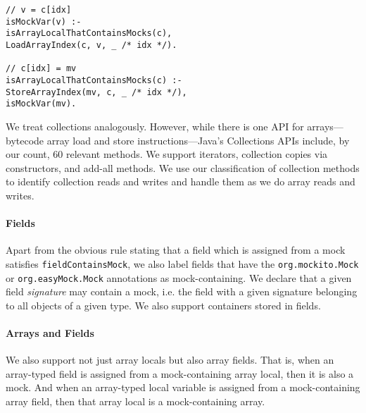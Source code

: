 \begin{lstlisting}[basicstyle=\ttfamily\small,numbers=none]
// v = c[idx]
isMockVar(v) :-
isArrayLocalThatContainsMocks(c),
LoadArrayIndex(c, v, _ /* idx */).

// c[idx] = mv
isArrayLocalThatContainsMocks(c) :-
StoreArrayIndex(mv, c, _ /* idx */),
isMockVar(mv).
\end{lstlisting}

We treat collections analogously. However, while there is one API for arrays---bytecode array load and store instructions---Java's Collections APIs include, by our count, 60 relevant methods. We support iterators, collection copies via constructors, and add-all methods. We use our classification of collection methods to identify collection reads and writes and handle them as we do array reads and writes.%

\paragraph{Fields} Apart from the obvious rule stating that a field which is assigned from a mock satisfies {\tt fieldContainsMock}, we also label fields that have the {\tt org.mockito.Mock} or {\tt org.easyMock.Mock} annotations as mock-containing. We declare that a given field \emph{signature} may contain a mock, i.e. the field with a given signature belonging to all objects of a given type. We also support containers stored in fields.

\paragraph{Arrays and Fields} We also support not just array locals but also array fields. That is, when an array-typed field is assigned from a mock-containing array local, then it is also a mock. And when an array-typed local variable is assigned from a mock-containing array field, then that array local is a mock-containing array.

